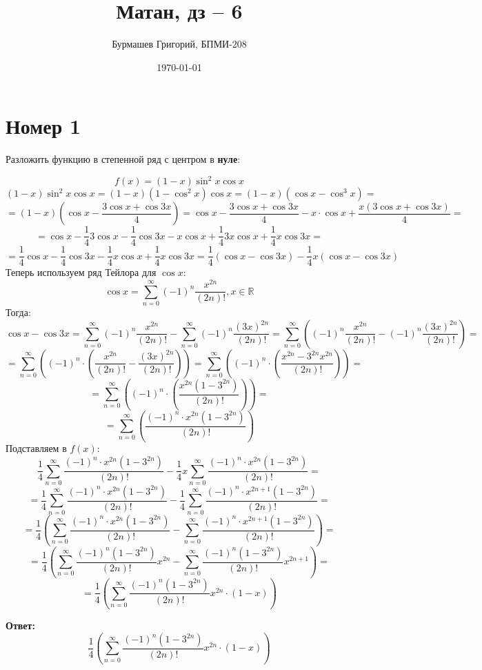 \documentclass[a4paper,12pt]{article}
\author{Бурмашев Григорий, БПМИ-208}
\title{Матан, дз -- 6}
\date{\today}
\begin{document}
\maketitle
\section*{Номер 1}
\begin{center}
Разложить функцию в степенной ряд с центром в \textbf{нуле}:
\end{center}
\[
f(x) = (1-x)\sin^2x \cos x
\]
\[
(1-x)\sin^2x \cos x = (1-x)(1 - \cos^2x) \cos x = (1-x)(\cos x - \cos^3 x) =
\]
\[
=
(1 - x) \left(\cos x - \frac{3 \cos x  + \cos 3x}{4}\right) = \cos x - \frac{3\cos x + \cos 3 x}{4} - x \cdot \cos x+ \frac{x(3 \cos x + \cos 3 x)}{4} =
\]
\[
= \cos x - \frac{1}{4}3 \cos x - \frac{1}{4} \cos 3 x - x \cos x + \frac{1}{4} 3x \cos x + \frac{1}{4}x \cos 3x = 
\]
\[
=
\frac{1}{4} \cos x  - \frac{1}{4} \cos 3 x - \frac{1}{4} x \cos x + \frac{1}{4}x \cos 3x = \frac{1}{4} (\cos x - \cos 3 x )  - \frac{1}{4}x (\cos x - \cos 3 x)
\]
Теперь используем ряд Тейлора для $\cos x$:
\[
\cos x = \sum_{n = 0}^{\infty} (-1)^n \frac{x^{2n}}{(2n)!}, x \in \mathbb{R}
\]
Тогда:
\[
\cos x - \cos 3 x = \sum_{n = 0}^{\infty} (-1)^n \frac{x^{2n}}{(2n)!} - \sum_{n = 0}^{\infty} (-1)^n \frac{(3x)^{2n}}{(2n)!} = \sum_{n = 0}^{\infty}\left((-1)^n \frac{x^{2n}}{(2n)!} - (-1)^n\frac{(3x)^{2n}}{(2n)!} \right) = 
\]
\[
=
\sum_{n = 0}^{\infty} \left(
 (-1)^n 
\cdot
 \left(
\frac{x^{2n}}{(2n)!} - \frac{(3x)^{2n}}{(2n)!}
\right)
\right)
=
\sum_{n = 0}^{\infty} \left(
 (-1)^n 
\cdot
 \left(
\frac{x^{2n} - 3^{2n} x^{2n}}{(2n)!}
\right)
\right)
=
\]
\[
=
\sum_{n = 0}^{\infty} \left(
 (-1)^n 
\cdot
 \left(
\frac{x^{2n}(1 - 3^{2n})}{(2n)!}
\right)
\right)
=
\]
\[
=
\sum_{n = 0}^{\infty} 
 \left(
\frac{ (-1)^n  \cdot x^{2n}(1 - 3^{2n})}{(2n)!}
\right)
\]
Подставляем в $f(x)$:
\[
\frac{1}{4} \sum_{n = 0}^{\infty} 
\frac{ (-1)^n  \cdot x^{2n}(1 - 3^{2n})}{(2n)!} -
\frac{1}{4}x \sum_{n = 0}^{\infty} 
\frac{ (-1)^n  \cdot x^{2n}(1 - 3^{2n})}{(2n)!}
 = 
\]
\[
 = 
\frac{1}{4} \sum_{n = 0}^{\infty} 
\frac{ (-1)^n  \cdot x^{2n}(1 - 3^{2n})}{(2n)!} -
\frac{1}{4}\sum_{n = 0}^{\infty} 
\frac{ (-1)^n  \cdot x^{2n + 1}(1 - 3^{2n})}{(2n)!}
= 
\]
\[
=
\frac{1}{4} \left(
 \sum_{n = 0}^{\infty} 
\frac{ (-1)^n  \cdot x^{2n}(1 - 3^{2n})}{(2n)!} -
\sum_{n = 0}^{\infty} 
\frac{ (-1)^n  \cdot x^{2n + 1}(1 - 3^{2n})}{(2n)!}
\right) = 
\]
\[
=
\frac{1}{4} \left(
 \sum_{n = 0}^{\infty} 
\frac{ (-1)^n (1 - 3^{2n})}{(2n)!}  x^{2n} -
\sum_{n = 0}^{\infty} 
\frac{ (-1)^n (1 - 3^{2n})}{(2n)!}x^{2n + 1}
\right) =
\] 
\[
=
\frac{1}{4} \left( \sum_{n = 0}^{\infty} 
\frac{ (-1)^n (1 - 3^{2n})}{(2n)!}  x^{2n} \cdot (1-x)\right)
\]
\begin{center}
\textbf{Ответ: } 
\[
\frac{1}{4} \left( \sum_{n = 0}^{\infty} 
\frac{ (-1)^n (1 - 3^{2n})}{(2n)!}  x^{2n} \cdot (1-x)\right)
\]
\end{center}
\clearpage
\end{document}

